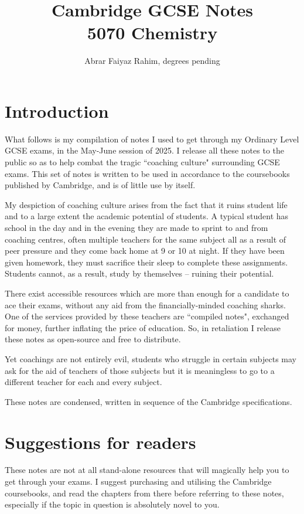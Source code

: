 \documentclass{article}
\title {Cambridge GCSE Notes \\ 5070 Chemistry }
\author {Abrar Faiyaz Rahim, degrees pending}
\date {}
\begin{document}
\maketitle \newpage
\section*{Introduction}
What follows is my compilation of notes I used to get through my Ordinary Level GCSE 
exams, in the May-June session of 2025. I release all these notes to the public so as to 
help combat the tragic ``coaching culture" surrounding GCSE exams. This set of notes is 
written to be used in accordance to the coursebooks published by Cambridge, and is of
little use by itself.

My despiction of coaching culture arises from the fact that it ruins student life and
to a large extent the academic potential of students. A typical student has school in the 
day and in the evening they are made to sprint to and from coaching centres, often 
multiple teachers for the same subject all as a result of peer pressure and they come back home at 
9 or 10 at night. If they have been given homework, they must sacrifice their sleep to
complete these assignments. Students cannot, as a result, study by themselves -- ruining
their potential.

There exist accessible resources which are more than enough for a candidate to ace their 
exams, without any aid from the financially-minded coaching sharks. One of the services
provided by these teachers are ``compiled notes", exchanged for money, 
further inflating the price of education. So, in retaliation I release these 
notes as open-source and free to distribute.

Yet coachings are not entirely evil, students who struggle in certain subjects may ask 
for the aid of teachers of those subjects but it is meaningless to go to a different 
teacher for each and every subject.

These notes are condensed, written in sequence of the Cambridge specifications.

\section*{Suggestions for readers}
These notes are not at all stand-alone resources that will magically help you to get 
through your exams. I suggest purchasing and utilising the Cambridge coursebooks, and
read the chapters from there before referring to these notes, especially if the topic
in question is absolutely novel to you. 
\end{document}
